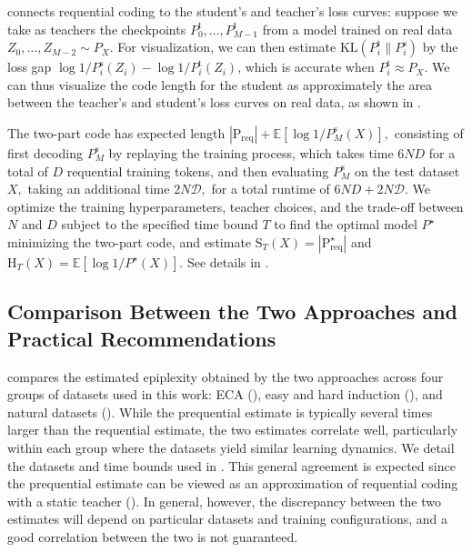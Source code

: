\documentclass[twoside]{article}
\newcommand{\E}{\mathbb{E}}
\newcommand{\D}{\mathcal{D}}
\newcommand{\rH}{\mathrm{H}}
\newcommand{\rS}{\mathrm{S}}
\begin{document}
 connects requential coding to the student's and teacher's loss curves: suppose we take as teachers the checkpoints $P^{\mathrm{t}}_0,\ldots,P^{\mathrm{t}}_{M-1}$ from a model trained on real data $Z_0,\ldots,Z_{M-2} \sim P_X$. For visualization, we can then estimate $\mathrm{KL}(P^{\mathrm{t}}_i\|P^{\mathrm{s}}_i)$ by the loss gap $\log 1/P^{\mathrm{s}}_i(Z_i) - \log 1/P^{\mathrm{t}}_i(Z_i)$, which is accurate when $P^{\mathrm{t}}_i \approx P_X$. 
%
We can thus visualize the code length for the student as approximately the area between the teacher's and student's loss curves on real data, as shown in . 

The two-part code has expected length $|\mathrm{P}_{\mathrm{req}}| + \E[\log 1/P^{\mathrm{s}}_M(X)],$ consisting of first decoding $P^{\mathrm{s}}_M$ by replaying the training process, which takes time $6ND$ for a total of $D$ requential training tokens, and then evaluating $P^{\mathrm{s}}_M$ on the test dataset $X,$ taking an additional time $2N\D,$ for a total runtime of $6ND + 2N\D$. We optimize the training hyperparameters, teacher choices, and the trade-off between $N$ and $D$ subject to the specified time bound $T$ to find the optimal model $P^\star$ minimizing the two-part code, and estimate $\rS_T(X) = |\mathrm{P}_{\mathrm{req}}^\star|$ and $\rH_T(X) = \E[\log 1/P^\star(X)].$ See details in .

\subsection{Comparison Between the Two Approaches and Practical Recommendations}\label{sec:preq-proxy}
 compares the estimated epiplexity obtained by the two approaches across four groups of datasets used in this work: ECA (), easy and hard induction (), and natural datasets (). While the prequential estimate is typically several times larger than the requential estimate, the two estimates correlate well, particularly within each group where the datasets yield similar learning dynamics. We detail the datasets and time bounds used in . This general agreement is expected since the prequential estimate can be viewed as an approximation of requential coding with a static teacher (). In general, however, the discrepancy between the two estimates will depend on particular datasets and training configurations, and a good correlation between the two is not guaranteed. 
\end{document}
